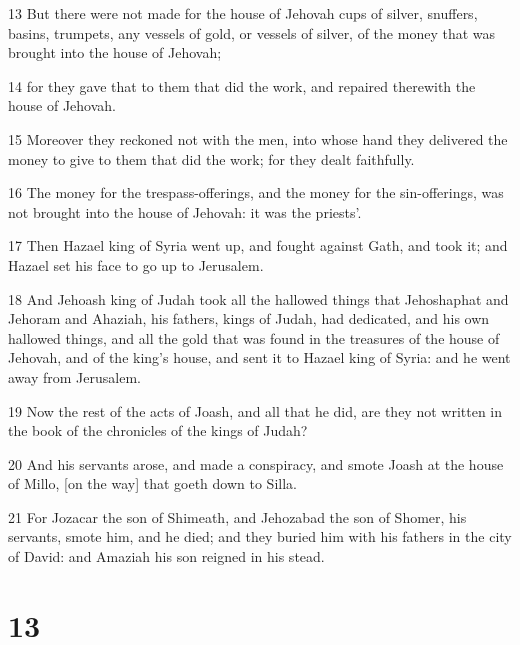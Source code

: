 \par 13 But there were not made for the house of Jehovah cups of silver, snuffers, basins, trumpets, any vessels of gold, or vessels of silver, of the money that was brought into the house of Jehovah;
\par 14 for they gave that to them that did the work, and repaired therewith the house of Jehovah.
\par 15 Moreover they reckoned not with the men, into whose hand they delivered the money to give to them that did the work; for they dealt faithfully.
\par 16 The money for the trespass-offerings, and the money for the sin-offerings, was not brought into the house of Jehovah: it was the priests'.
\par 17 Then Hazael king of Syria went up, and fought against Gath, and took it; and Hazael set his face to go up to Jerusalem.
\par 18 And Jehoash king of Judah took all the hallowed things that Jehoshaphat and Jehoram and Ahaziah, his fathers, kings of Judah, had dedicated, and his own hallowed things, and all the gold that was found in the treasures of the house of Jehovah, and of the king's house, and sent it to Hazael king of Syria: and he went away from Jerusalem.
\par 19 Now the rest of the acts of Joash, and all that he did, are they not written in the book of the chronicles of the kings of Judah?
\par 20 And his servants arose, and made a conspiracy, and smote Joash at the house of Millo, [on the way] that goeth down to Silla.
\par 21 For Jozacar the son of Shimeath, and Jehozabad the son of Shomer, his servants, smote him, and he died; and they buried him with his fathers in the city of David: and Amaziah his son reigned in his stead.

\chapter{13}

